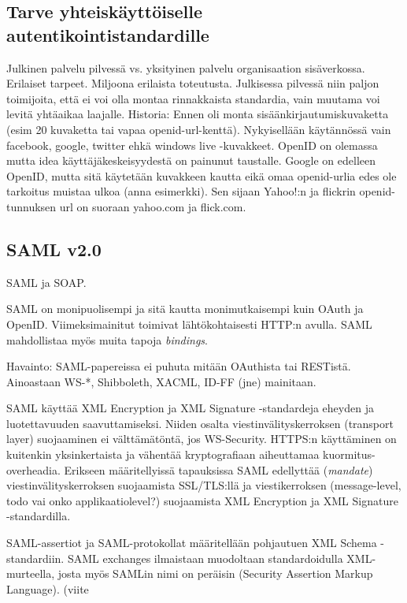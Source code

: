 \documentclass[finnish,gradu]{tktltiki}
\begin{document}
  \subsection{Tarve yhteiskäyttöiselle autentikointistandardille} %
  \label{sub:tarve_yhteiskäyttöiselle_autentikointistandardille}
  Julkinen palvelu pilvessä vs. yksityinen palvelu organisaation sisäverkossa. Erilaiset tarpeet. Miljoona erilaista toteutusta. Julkisessa pilvessä niin paljon toimijoita, että ei voi olla montaa rinnakkaista standardia, vain muutama voi levitä yhtäaikaa laajalle. Historia: Ennen oli monta sisäänkirjautumiskuvaketta (esim 20 kuvaketta tai vapaa openid-url-kenttä). Nykyisellään käytännössä vain facebook, google, twitter ehkä windows live -kuvakkeet. OpenID on olemassa mutta idea käyttäjäkeskeisyydestä on painunut taustalle. Google on edelleen OpenID, mutta sitä käytetään kuvakkeen kautta eikä omaa openid-urlia edes ole tarkoitus muistaa ulkoa (anna esimerkki). Sen sijaan Yahoo!:n ja flickrin openid-tunnuksen url on suoraan yahoo.com ja flick.com.



  \subsection{SAML v2.0} %
  \label{sub:saml_v2_0}
  SAML ja SOAP.

  SAML on monipuolisempi ja sitä kautta monimutkaisempi kuin OAuth ja OpenID. Viimeksimainitut toimivat lähtökohtaisesti HTTP:n avulla. SAML mahdollistaa myös muita tapoja \emph{bindings}.

  Havainto: SAML-papereissa ei puhuta mitään OAuthista tai RESTistä. Ainoastaan WS-*, Shibboleth, XACML, ID-FF (jne) mainitaan.

  SAML käyttää XML Encryption ja XML Signature -standardeja eheyden ja luotettavuuden saavuttamiseksi.
  Niiden osalta viestinvälityskerroksen (transport layer) suojaaminen ei välttämätöntä, jos WS-Security.
  HTTPS:n käyttäminen on kuitenkin yksinkertaista ja vähentää kryptografiaan aiheuttamaa kuormitus-overheadia.
  Erikseen määritellyissä tapauksissa SAML edellyttää (\emph{mandate}) viestinvälityskerroksen suojaamista SSL/TLS:llä ja viestikerroksen (message-level, todo vai onko applikaatiolevel?) suojaamista XML Encryption ja XML Signature -standardilla.

  SAML-assertiot ja SAML-protokollat määritellään pohjautuen XML Schema -standardiin.
  SAML exchanges ilmaistaan muodoltaan standardoidulla XML-murteella, josta myös SAMLin nimi on peräisin (Security Assertion Markup Language). (viite
\end{document}
